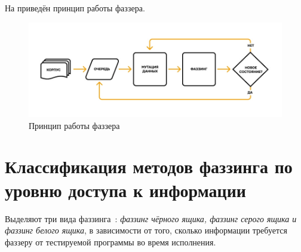 \newpage
На  приведён принцип работы фаззера.

\begin{figure}[ht] 
	\center
	\includegraphics [scale=0.8] {my_folder/images/fuzzer_principe}
	\caption{Принцип работы фаззера} 
	\label{fig:fuzzer-works-ch2}  
\end{figure}

%
%
%
	


	
\section{Классификация методов фаззинга по уровню доступа к информации} \label{ch2:sec-abbr} %
	Выделяют три вида фаззинга~\cite{???}: \textit{фаззинг чёрного ящика, фаззинг серого ящика и фаззинг белого ящика}, в зависимости от того, сколько информации требуется фаззеру от тестируемой программы во время исполнения. 
	
